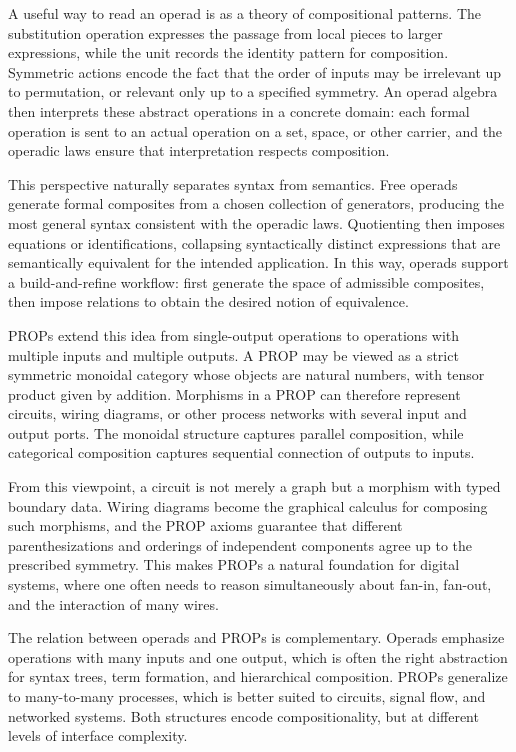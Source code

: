 \documentclass[11pt]{article}
\begin{document}
A useful way to read an operad is as a theory of compositional patterns. The substitution operation expresses the passage from local pieces to larger expressions, while the unit records the identity pattern for composition. Symmetric actions encode the fact that the order of inputs may be irrelevant up to permutation, or relevant only up to a specified symmetry. An operad algebra then interprets these abstract operations in a concrete domain: each formal operation is sent to an actual operation on a set, space, or other carrier, and the operadic laws ensure that interpretation respects composition.

This perspective naturally separates syntax from semantics. Free operads generate formal composites from a chosen collection of generators, producing the most general syntax consistent with the operadic laws. Quotienting then imposes equations or identifications, collapsing syntactically distinct expressions that are semantically equivalent for the intended application. In this way, operads support a build-and-refine workflow: first generate the space of admissible composites, then impose relations to obtain the desired notion of equivalence.

PROPs extend this idea from single-output operations to operations with multiple inputs and multiple outputs. A PROP may be viewed as a strict symmetric monoidal category whose objects are natural numbers, with tensor product given by addition. Morphisms in a PROP can therefore represent circuits, wiring diagrams, or other process networks with several input and output ports. The monoidal structure captures parallel composition, while categorical composition captures sequential connection of outputs to inputs.

From this viewpoint, a circuit is not merely a graph but a morphism with typed boundary data. Wiring diagrams become the graphical calculus for composing such morphisms, and the PROP axioms guarantee that different parenthesizations and orderings of independent components agree up to the prescribed symmetry. This makes PROPs a natural foundation for digital systems, where one often needs to reason simultaneously about fan-in, fan-out, and the interaction of many wires.

The relation between operads and PROPs is complementary. Operads emphasize operations with many inputs and one output, which is often the right abstraction for syntax trees, term formation, and hierarchical composition. PROPs generalize to many-to-many processes, which is better suited to circuits, signal flow, and networked systems. Both structures encode compositionality, but at different levels of interface complexity.
\end{document}
